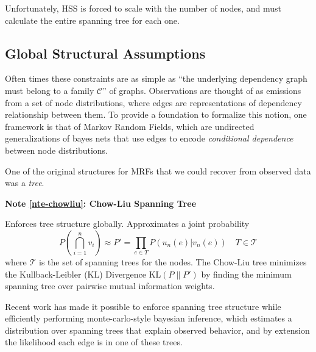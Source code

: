 \documentclass[%
	12pt,
		oneside,
		letterpaper
]{book}
\newcounter{quartocalloutnteno}
\newcommand{\quartocalloutnte}[1]{\refstepcounter{quartocalloutnteno}\label{#1}}
\begin{document}
Unfortunately, HSS is forced to scale with the number of nodes, and must calculate the entire spanning tree for each one.

\subsection{Global Structural Assumptions}\label{global-structural-assumptions}

Often times these constraints are as simple as ``the underlying dependency graph must belong to a family \(\mathcal{C}\)'' of graphs.
Observations are thought of as emissions from a set of node distributions, where edges are representations of dependency relationship between them.
To provide a foundation to formalize this notion, one framework is that of Markov Random Fields, which are undirected generalizations of bayes nets \autocite{Markovrandomfields_Kindermann1980} that use edges to encode \emph{conditional dependence} between node distributions.

One of the original structures for MRFs that we could recover from observed data was a \emph{tree}.

\begin{tcolorbox}[enhanced jigsaw, toprule=.15mm, left=2mm, leftrule=.75mm, rightrule=.15mm, colframe=quarto-callout-note-color-frame, arc=.35mm, colback=white, opacityback=0, bottomrule=.15mm, breakable]

\quartocalloutnte{nte-chowliu} 

\vspace{-3mm}\textbf{Note \ref*{nte-chowliu}: Chow-Liu Spanning Tree}\vspace{3mm}

Enforces tree structure globally.
Approximates a joint probability
\[
P\left(\bigcap_{i=1}^n v_i\right) \approx P' = \prod_{e\in T} P(u_n(e)|v_n(e)) \quad T\in \mathcal{T}
\]
where \(\mathcal{T}\) is the set of spanning trees for the nodes.
The Chow-Liu tree minimizes the Kullback-Leibler (KL) Divergence \(\text{KL}(P \| P')\) by finding the minimum spanning tree over pairwise mutual information weights.\autocite{Approximatingdiscreteprobability_Chow1968}

\end{tcolorbox}

Recent work has made it possible to enforce spanning tree structure while efficiently performing monte-carlo-style bayesian inference, which estimates a distribution over spanning trees that explain observed behavior, and by extension the likelihood each edge is in one of these trees. \autocite{BayesianSpanningTree_Duan2021}
\end{document}
